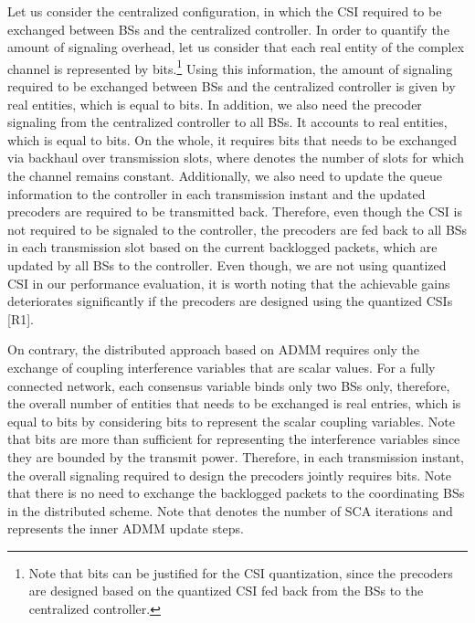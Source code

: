 \begin{enumerate}
\begin{itemize}
Let us consider the centralized configuration, in which the \ac{CSI} required to be exchanged between \acp{BS} and the centralized controller. In order to quantify the amount of signaling overhead, let us consider that each real entity of the complex channel is represented by  bits.\footnote{Note that  bits can be justified for the \ac{CSI} quantization, since the precoders are designed based on the quantized \ac{CSI} fed back from the \acp{BS} to the centralized controller.} Using this information, the amount of signaling required to be exchanged between \acp{BS} and the centralized controller is given by  real entities, which is equal to  bits. In addition, we also need the precoder signaling from the centralized controller to all \acp{BS}. It accounts to  real entities, which is equal to  bits. On the whole, it requires  bits that needs to be exchanged via backhaul over  transmission slots, where  denotes the number of slots for which the channel remains constant. Additionally, we also need to update the queue information to the controller in each transmission instant and the updated precoders are required to be transmitted back. Therefore, even though the \ac{CSI} is not required to be signaled to the controller, the precoders are fed back to all \acp{BS} in each transmission slot based on the current backlogged packets, which are updated by all \acp{BS} to the controller. Even though, we are not using quantized \ac{CSI} in our performance evaluation, it is worth noting that the achievable gains deteriorates significantly if the precoders are designed using the quantized \acp{CSI} [R1].

On contrary, the distributed approach based on \ac{ADMM} requires only the exchange of coupling interference variables that are scalar values. For a fully connected network, each consensus variable binds only two \acp{BS} only, therefore, the overall number of entities that needs to be exchanged is  real entries, which is equal to  bits by considering  bits to represent the scalar coupling variables. Note that  bits are more than sufficient for representing the interference variables since they are bounded by the transmit power. Therefore, in each transmission instant, the overall signaling required to design the precoders jointly requires  bits. Note that there is no need to exchange the backlogged packets to the coordinating \acp{BS} in the distributed scheme. Note that  denotes the number of \ac{SCA} iterations and  represents the inner \ac{ADMM} update steps.


\end{itemize}
\end{enumerate}
